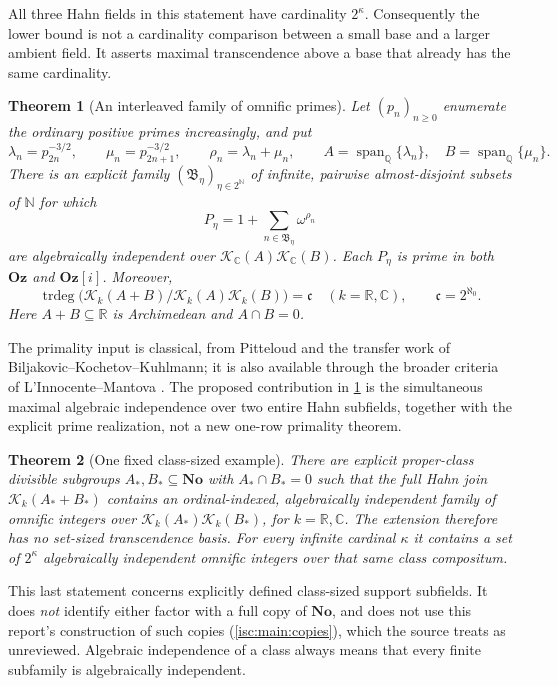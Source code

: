 \documentclass[11pt,letterpaper]{article}
\newtheorem{mainthm}{Theorem}
\theoremstyle{definition}
\theoremstyle{remark}
\newcommand{\No}{\mathbf{No}}
\newcommand{\Oz}{\mathbf{Oz}}
\newcommand{\R}{\mathbb R}
\newcommand{\C}{\mathbb C}
\newcommand{\Q}{\mathbb Q}
\newcommand{\N}{\mathbb N}
\newcommand{\K}[2]{\mathcal K_{#1}(#2)}
\newcommand{\Span}{\operatorname{span}_{\Q}}
\newcommand{\trdeg}{\operatorname{trdeg}}
\newcommand{\cc}{\mathfrak c}
\numberwithin{equation}{section}
\begin{document}
All three Hahn fields in this statement have cardinality $2^\kappa$.
Consequently the lower bound is not a cardinality comparison between a
small base and a larger ambient field. It asserts maximal transcendence
above a base that already has the same cardinality.

\begin{mainthm}[An interleaved family of omnific primes]\label{isc:hj:main:prime}
Let $(p_n)_{n\geq0}$ enumerate the ordinary positive primes increasingly,
and put
\[
 \lambda_n=p_{2n}^{-3/2},\qquad
 \mu_n=p_{2n+1}^{-3/2},\qquad \rho_n=\lambda_n+\mu_n,
 \qquad A=\Span\{\lambda_n\},\quad B=\Span\{\mu_n\}.
\]
There is an explicit family $(\mathfrak B_\eta)_{\eta\in2^{\N}}$ of infinite,
pairwise almost-disjoint subsets of $\N$ for which
\begin{equation}\label{isc:hj:eq:primefamily-intro}
 P_\eta=1+\sum_{n\in\mathfrak B_\eta}\omega^{\rho_n}
\end{equation}
are algebraically independent over $\K{\C}{A}\K{\C}{B}$.
Each $P_\eta$ is prime in both $\Oz$ and $\Oz[i]$. Moreover,
\[
 \trdeg\bigl(\K{k}{A+B}/\K{k}{A}\K{k}{B}\bigr)=\cc
 \quad(k=\R,\C),\qquad \cc=2^{\aleph_0}.
\]
Here $A+B\subseteq\R$ is Archimedean and $A\cap B=0$.
\end{mainthm}

The primality input is classical, from Pitteloud and the transfer work of
Biljakovic--Kochetov--Kuhlmann; it is also available through the broader
criteria of L'Innocente--Mantova \cite{Pitteloud,BKK,LM}. The proposed
contribution in \cref{isc:hj:main:prime} is the simultaneous maximal
algebraic independence over two entire Hahn subfields, together with the
explicit prime realization, not a new one-row primality theorem.

\begin{mainthm}[One fixed class-sized example]\label{isc:hj:main:class}
There are explicit proper-class divisible subgroups $A_*,B_*\subseteq\No$
with $A_*\cap B_*=0$ such that the full Hahn join
$\K{k}{A_*+B_*}$ contains an ordinal-indexed, algebraically independent
family of omnific integers over $\K{k}{A_*}\K{k}{B_*}$, for
$k=\R,\C$. The extension therefore has no set-sized transcendence basis.
For every infinite cardinal $\kappa$ it contains a set of $2^\kappa$
algebraically independent omnific integers over that same class compositum.
\end{mainthm}

This last statement concerns explicitly defined class-sized support
subfields. It does \emph{not} identify either factor with a full copy of
$\No$, and does not use this report's construction of such copies
(\cref{isc:main:copies}), which the source treats as unreviewed.
Algebraic independence of a class always means that every finite
subfamily is algebraically independent.
\end{document}
